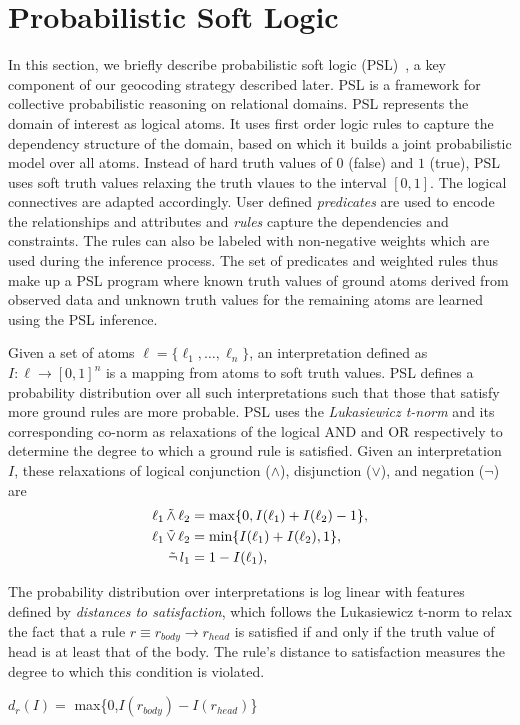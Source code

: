 \documentclass[letterpaper]{article}
\begin{document}
\section{Probabilistic Soft Logic}
\label{sectionPSL}
In this section, we briefly describe probabilistic soft logic (PSL)~\cite{kimmig2012short}, a key
component of our geocoding strategy described later.
PSL is a framework for collective probabilistic reasoning on relational domains.
PSL represents the domain of interest as logical atoms.
It uses first order logic rules to capture the dependency structure of the domain, based on which it builds a joint probabilistic model over all atoms.
Instead of hard truth values of $0$ (false) and $1$ (true), PSL uses soft truth values relaxing the truth vlaues to the interval $[0,1]$.
The logical connectives are adapted accordingly.
User defined \emph{predicates} are used to encode the relationships and attributes and \emph{rules} capture the  dependencies and constraints.
The rules can also be
labeled with non-negative weights which are used during the inference process.
The set of predicates and weighted rules thus make up a PSL program where known truth values of ground atoms derived from observed data and unknown truth values for the remaining atoms are learned using the PSL inference.

Given a set of atoms 
$\ell = \{\ell_1,\ldots,\ell_n\}$,
an interpretation defined as 
$I : \ell \rightarrow [0,1]^n$
is a mapping from atoms to soft truth values.
PSL defines a probability distribution over all such interpretations such that those that satisfy more ground rules are more probable.
PSL uses the \emph{Lukasiewicz t-norm} and its corresponding co-norm as relaxations of the logical AND and OR respectively to determine the degree to which a ground rule is satisfied.
Given an interpretation $\mathit{I}$, these relaxations of logical conjunction ($\wedge$), disjunction ($\vee$), and negation ($\neg$) are
\small
\begin{align*}
\ell_1 \softand \ell_2 &= \max\{0, I(\ell_1) + I(\ell_2) - 1\},\\
\ell_1 \softor \ell_2 &= \min\{I(\ell_1) + I(\ell_2), 1\},\\
\softneg l_1 &= 1 - I(\ell_1),
\end{align*}  

\normalsize
The probability distribution over interpretations is log linear with features defined by \emph{distances to satisfaction}, which follows the Lukasiewicz t-norm to relax the fact that
a rule $\mathit{r} \equiv \mathit{r_{body}} \rightarrow \mathit{r_{head}} $  is satisfied if and only if the truth value of head is at least that of the body. The rule's distance to satisfaction measures the degree to which this condition is violated.
 \newline
 \small
\begin{center} 
 $\mathit{d_r}(\mathit{I}) =$ max\{0,$\mathit{I(r_{body})} - \mathit{I(r_{head})}$\}
 \end{center}
\end{document}
